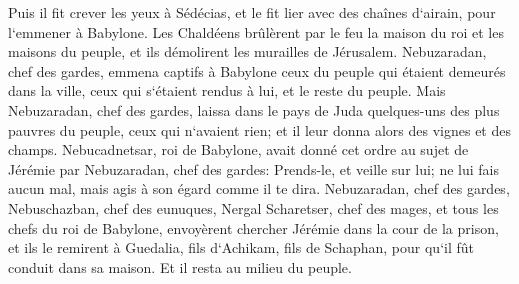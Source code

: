 \verse Puis il fit crever les yeux à Sédécias, et le fit lier avec des chaînes d`airain, pour l`emmener à Babylone. 
\verse Les Chaldéens brûlèrent par le feu la maison du roi et les maisons du peuple, et ils démolirent les murailles de Jérusalem. 
\verse Nebuzaradan, chef des gardes, emmena captifs à Babylone ceux du peuple qui étaient demeurés dans la ville, ceux qui s`étaient rendus à lui, et le reste du peuple. 
\verse Mais Nebuzaradan, chef des gardes, laissa dans le pays de Juda quelques-uns des plus pauvres du peuple, ceux qui n`avaient rien; et il leur donna alors des vignes et des champs. 
\verse Nebucadnetsar, roi de Babylone, avait donné cet ordre au sujet de Jérémie par Nebuzaradan, chef des gardes: 
\verse Prends-le, et veille sur lui; ne lui fais aucun mal, mais agis à son égard comme il te dira. 
\verse Nebuzaradan, chef des gardes, Nebuschazban, chef des eunuques, Nergal Scharetser, chef des mages, et tous les chefs du roi de Babylone, 
\verse envoyèrent chercher Jérémie dans la cour de la prison, et ils le remirent à Guedalia, fils d`Achikam, fils de Schaphan, pour qu`il fût conduit dans sa maison. Et il resta au milieu du peuple. 
